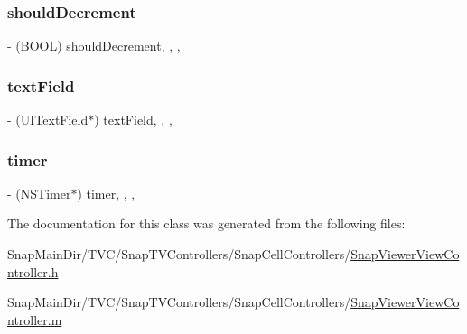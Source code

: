 \hypertarget{interface_snap_viewer_view_controller_a63a8403a56f19f85adb80622a70b53e8}{}\label{interface_snap_viewer_view_controller_a63a8403a56f19f85adb80622a70b53e8} 
\subsubsection{\texorpdfstring{should\+Decrement}{shouldDecrement}}
{\footnotesize\ttfamily -\/ (B\+O\+OL) should\+Decrement\hspace{0.3cm}{\ttfamily [read]}, {\ttfamily [write]}, {\ttfamily [nonatomic]}, {\ttfamily [assign]}}

\hypertarget{interface_snap_viewer_view_controller_a243bf0b7d697aafbca90fe98d3f74c1b}{}\label{interface_snap_viewer_view_controller_a243bf0b7d697aafbca90fe98d3f74c1b} 
\subsubsection{\texorpdfstring{text\+Field}{textField}}
{\footnotesize\ttfamily -\/ (U\+I\+Text\+Field$\ast$) text\+Field\hspace{0.3cm}{\ttfamily [read]}, {\ttfamily [write]}, {\ttfamily [nonatomic]}, {\ttfamily [strong]}}

\hypertarget{interface_snap_viewer_view_controller_aa4da96549115b3f0da7506889547cbe8}{}\label{interface_snap_viewer_view_controller_aa4da96549115b3f0da7506889547cbe8} 
\subsubsection{\texorpdfstring{timer}{timer}}
{\footnotesize\ttfamily -\/ (N\+S\+Timer$\ast$) timer\hspace{0.3cm}{\ttfamily [read]}, {\ttfamily [write]}, {\ttfamily [nonatomic]}, {\ttfamily [strong]}}



The documentation for this class was generated from the following files\+:\begin{DoxyCompactItemize}
\item 
Snap\+Main\+Dir/\+T\+V\+C/\+Snap\+T\+V\+Controllers/\+Snap\+Cell\+Controllers/\hyperlink{_snap_viewer_view_controller_8h}{Snap\+Viewer\+View\+Controller.\+h}\item 
Snap\+Main\+Dir/\+T\+V\+C/\+Snap\+T\+V\+Controllers/\+Snap\+Cell\+Controllers/\hyperlink{_snap_viewer_view_controller_8m}{Snap\+Viewer\+View\+Controller.\+m}\end{DoxyCompactItemize}
